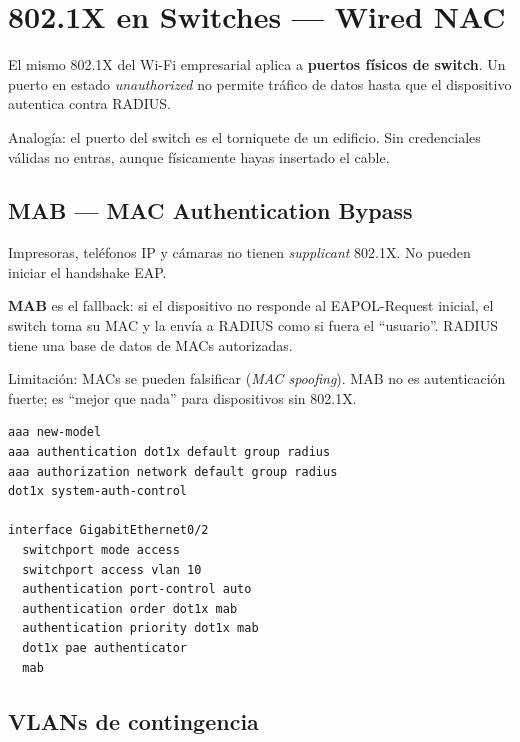 \section{ 802.1X en Switches --- Wired NAC}

\begin{concepto}
El mismo 802.1X del Wi-Fi empresarial aplica a \textbf{puertos físicos de switch}. Un
puerto en estado \emph{unauthorized} no permite tráfico de datos hasta que el dispositivo
autentica contra RADIUS.

Analogía: el puerto del switch es el torniquete de un edificio. Sin credenciales válidas
no entras, aunque físicamente hayas insertado el cable.
\end{concepto}

\subsection{MAB --- MAC Authentication Bypass}

\begin{concepto}
Impresoras, teléfonos IP y cámaras no tienen \emph{supplicant} 802.1X. No pueden
iniciar el handshake EAP.

\textbf{MAB} es el fallback: si el dispositivo no responde al EAPOL-Request inicial,
el switch toma su MAC y la envía a RADIUS como si fuera el ``usuario''. RADIUS tiene
una base de datos de MACs autorizadas.

Limitación: MACs se pueden falsificar (\emph{MAC spoofing}). MAB no es autenticación
fuerte; es ``mejor que nada'' para dispositivos sin 802.1X.
\end{concepto}

\begin{codigo}
\begin{lstlisting}
aaa new-model
aaa authentication dot1x default group radius
aaa authorization network default group radius
dot1x system-auth-control

interface GigabitEthernet0/2
  switchport mode access
  switchport access vlan 10
  authentication port-control auto
  authentication order dot1x mab
  authentication priority dot1x mab
  dot1x pae authenticator
  mab
\end{lstlisting}
\end{codigo}

\subsection{VLANs de contingencia}

